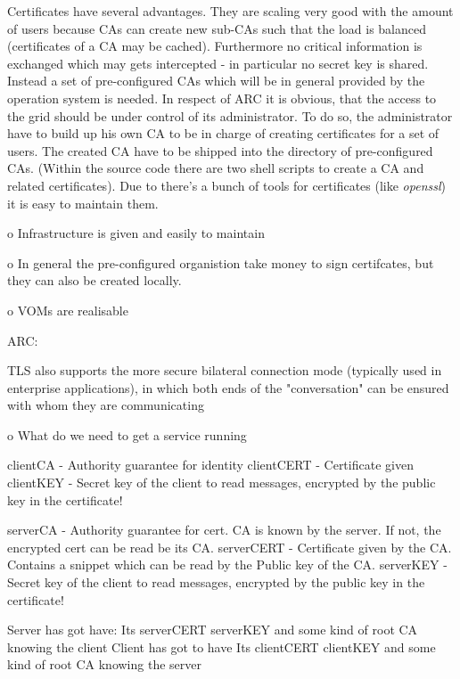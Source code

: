 Certificates have several advantages. They are scaling very good with the amount of users because CAs can create new sub-CAs such that the load is balanced (certificates of a CA may be cached). Furthermore no critical information is exchanged which may gets intercepted - in particular no secret key is shared. Instead a set of pre-configured CAs which will be in general provided by the operation system is needed.
In respect of ARC it is obvious, that the access to the grid should be under control of its administrator. To do so, the administrator have to build up his own CA to be in charge of creating certificates for a set of users. 
The created CA have to be shipped into the directory of pre-configured CAs.
(Within the source code there are two shell scripts to create a CA and related certificates). Due to there's a bunch of tools for certificates (like \textit{openssl}) it is easy to maintain them. 


o Infrastructure is given and easily to maintain

o In general the pre-configured organistion take money to sign certifcates, but they can also be created locally.

o VOMs are realisable

ARC:

TLS also supports the more secure bilateral connection mode (typically used in enterprise applications), in which both ends of the "conversation" can be ensured with whom they are communicating




o What do we need to get a service running

clientCA   - Authority guarantee for identity
clientCERT - Certificate given
clientKEY  - Secret key of the client to read messages, encrypted by the public key in the certificate!

serverCA   - Authority guarantee for cert. CA is known by the server. If not, the encrypted cert can be read be its CA.
serverCERT - Certificate given by the CA. Contains a snippet which can be read by the Public key of the CA.
serverKEY  - Secret key of the client to read messages, encrypted by the public key in the certificate!


Server has got have:
Its  serverCERT serverKEY and some kind of root CA knowing the client
Client has got to have
Its  clientCERT clientKEY and some kind of root CA knowing the server










